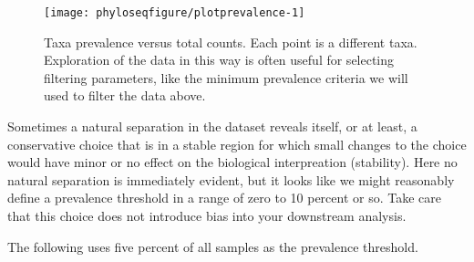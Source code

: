\begin{knitrout}
\color{fgcolor}
\end{knitrout}
\begin{figure}
\texttt{[image: phyloseqfigure/plotprevalence-1]}
\caption{Taxa prevalence versus total counts. Each point is a different taxa. Exploration of the data in this way is often useful for selecting filtering parameters, like the minimum prevalence criteria we will used to filter the data above.}
\end{figure}
Sometimes a natural separation in the dataset reveals itself,
or at least, a conservative choice that is in a stable region
for which small changes to the choice would have
minor or no effect on the biological interpreation (stability).
Here no natural separation is immediately evident,
but it looks like we might reasonably define a prevalence threshold
in a range of zero to 10 percent or so.
Take care that this choice does not introduce bias
into your downstream analysis.

The following uses five percent of all samples
as the prevalence threshold.


